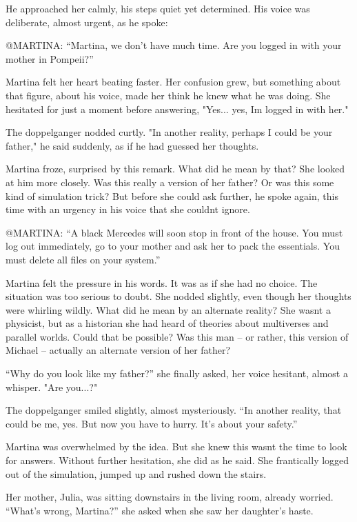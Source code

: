 \documentclass[
]{article}
\begin{document}
He approached her calmly, his steps quiet yet determined. His voice was
deliberate, almost urgent, as he spoke:

@MARTINA: ``Martina, we don't have much time. Are you logged in with
your mother in Pompeii?''

Martina felt her heart beating faster. Her confusion grew, but something
about that figure, about his voice, made her think he knew what he was
doing. She hesitated for just a moment before answering, "Yes... yes,
I\textquotesingle m logged in with her."

The doppelganger nodded curtly. "In another reality, perhaps I could be
your father," he said suddenly, as if he had guessed her thoughts.

Martina froze, surprised by this remark. What did he mean by that? She
looked at him more closely. Was this really a version of her father? Or
was this some kind of simulation trick? But before she could ask
further, he spoke again, this time with an urgency in his voice that she
couldn\textquotesingle t ignore.

@MARTINA: ``A black Mercedes will soon stop in front of the house. You
must log out immediately, go to your mother and ask her to pack the
essentials. You must delete all files on your system.''

Martina felt the pressure in his words. It was as if she had no choice.
The situation was too serious to doubt. She nodded slightly, even though
her thoughts were whirling wildly. What did he mean by an alternate
reality? She wasn\textquotesingle t a physicist, but as a historian she
had heard of theories about multiverses and parallel worlds. Could that
be possible? Was this man -- or rather, this version of Michael --
actually an alternate version of her father?

``Why do you look like my father?'' she finally asked, her voice
hesitant, almost a whisper. "Are you...?"

The doppelganger smiled slightly, almost mysteriously. ``In another
reality, that could be me, yes. But now you have to hurry. It's about
your safety.''

Martina was overwhelmed by the idea. But she knew this
wasn\textquotesingle t the time to look for answers. Without further
hesitation, she did as he said. She frantically logged out of the
simulation, jumped up and rushed down the stairs.

Her mother, Julia, was sitting downstairs in the living room, already
worried. ``What's wrong, Martina?'' she asked when she saw her
daughter's haste.
\end{document}
